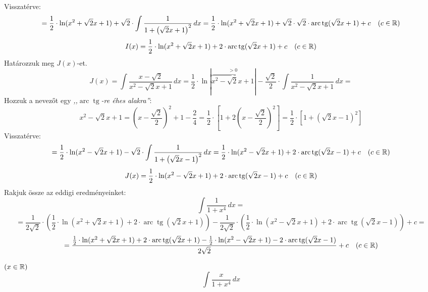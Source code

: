 \documentclass[a4paper,11.5pt]{article}
\DeclareMathOperator{\tg}{tg}
\DeclareMathOperator{\arc}{arc}
\begin{document}
\begin{exercise}
 		Visszatérve:
 		\[ =\frac{1}{2}\cdot\ln(x^2+\sqrt{2}x+1)+\sqrt{2}\cdot\int\frac{1}{1+\left(\sqrt{2}x+1\right)^2}\,dx=\frac{1}{2}\cdot\ln(x^2+\sqrt{2}x+1)+\sqrt{2}\cdot\sqrt{2}\cdot\arc\tg(\sqrt{2}x+1)+c\quad (c\in\R) \]
 		\[ I(x)=\frac{1}{2}\cdot\ln(x^2+\sqrt{2}x+1)+2\cdot\arc\tg(\sqrt{2}x+1)+c\quad (c\in\R) \]
 		Határozzuk meg $J(x)$-et.
 		\[ J(x)=\int\frac{x-\sqrt{2}}{x^2-\sqrt{2}x+1}\,dx=\frac{1}{2}\cdot\ln|\overbrace{x^2-\sqrt{2}x+1}^{>0}|-\frac{\sqrt{2}}{2}\cdot\int\frac{1}{x^2-\sqrt{2}x+1}\,dx=\]
 		Hozzuk a nevezőt egy \textit{,,$\arc\tg$-re éhes alakra''}:
 		\[ x^2-\sqrt{2}x+1=\left(x-\frac{\sqrt{2}}{2}\right)^2+1-\frac{2}{4}=\frac{1}{2}\cdot\left[1+2\left(x-\frac{\sqrt{2}}{2}\right)^2\right]=\frac{1}{2}\cdot\left[1+\left(\sqrt{2}x-1\right)^2\right] \]
 		Visszatérve:
 		\[=\frac{1}{2}\cdot\ln(x^2-\sqrt{2}x+1)-\sqrt{2}\cdot\int\frac{1}{1+\left(\sqrt{2}x-1\right)^2}\,dx=\frac{1}{2}\cdot\ln(x^2-\sqrt{2}x+1)+2\cdot\arc\tg(\sqrt{2}x-1)+c\quad (c\in\R) \]
 		\[ J(x)=\frac{1}{2}\cdot\ln(x^2-\sqrt{2}x+1)+2\cdot\arc\tg(\sqrt{2}x-1)+c\quad (c\in\R) \]
 		Rakjuk össze az eddigi eredményeinket:
 		\[ \int\frac{1}{1+x^4}\,dx =\]
 		\[=\frac{1}{2\sqrt{2}}\cdot\left(\frac{1}{2}\cdot\ln(x^2+\sqrt{2}x+1)+2\cdot\arc\tg(\sqrt{2}x+1)\right)-\frac{1}{2\sqrt{2}}\cdot\left(\frac{1}{2}\cdot\ln(x^2-\sqrt{2}x+1)+2\cdot\arc\tg(\sqrt{2}x-1)\right)+c= \]
 		\[=\frac{\frac{1}{2}\cdot\ln(x^2+\sqrt{2}x+1)+2\cdot\arc\tg(\sqrt{2}x+1)-\frac{1}{2}\cdot\ln(x^2-\sqrt{2}x+1)-2\cdot\arc\tg(\sqrt{2}x-1)}{2\sqrt{2}}+c\quad (c\in\R) \]
% 		
	\end{exercise}
	\begin{exercise}$(x\in\mathbb{R})$
		\[ \int\frac{x}{1+x^4}\,dx \]
	\end{exercise}
\end{document}
